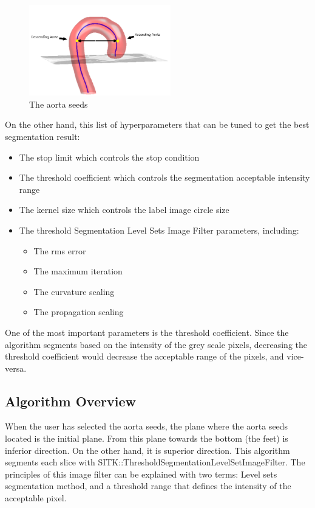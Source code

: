 \begin{figure}[ht]
    \centering
    \includegraphics[width=0.55\textwidth]{figures/Sample/Aorta_seeds.png}
    \caption[The Aorta Seeds]{The aorta seeds \citep{6346433}}
    \label{fig_aorta_seed}
\end{figure}

On the other hand, this list of hyperparameters that can be tuned to get the best segmentation result:
\begin{itemize}
\item The stop limit which controls the stop condition
\item The threshold coefficient which controls the segmentation acceptable intensity range
\item The kernel size which controls the label image circle size 
\item The threshold Segmentation Level Sets Image Filter parameters, including:
\begin{itemize}
\item The rms error
\item The maximum iteration
\item The curvature scaling
\item The propagation scaling
\end{itemize}
\end{itemize}

One of the most important parameters is the threshold coefficient. Since the algorithm segments based on the intensity of the grey scale pixels, decreasing the threshold coefficient would decrease the acceptable range of the pixels, and vice-versa. 


\subsection{Algorithm Overview}

When the user has selected the aorta seeds, the plane where the aorta seeds located is the initial plane. From this plane towards the bottom (the feet) is inferior direction. On the other hand, it is superior direction. This algorithm segments each slice with SITK::ThresholdSegmentationLevelSetImageFilter. The principles of this image filter can be explained with two terms: Level sets segmentation method, and a threshold range that defines the intensity of the acceptable pixel.

